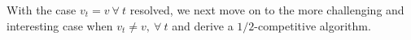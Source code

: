 

With the case $v_t=v \ \forall \ t$ resolved, we next move on to the more challenging and interesting case when $v_t\ne v, \ \forall \ t$ and derive a $1/2$-competitive algorithm.

